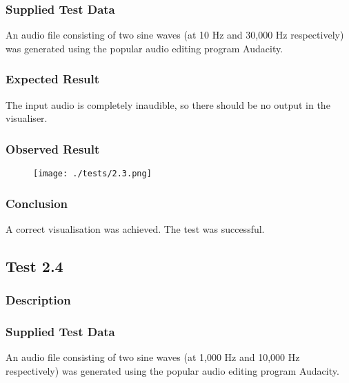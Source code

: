 \subsubsection*{Supplied Test Data}
An audio file consisting of two sine waves (at 10 Hz and 30,000 Hz respectively) was generated using the popular audio editing program Audacity.

\subsubsection*{Expected Result}
The input audio is completely inaudible, so there should be no output in the visualiser.

\subsubsection*{Observed Result}
\label{sec:evidence2.3}
\begin{figure}[H]
	\texttt{[image: ./tests/2.3.png]}
\end{figure}

\subsubsection*{Conclusion}
A correct visualisation was achieved. The test was successful.

\pagebreak
\subsection{Test 2.4}
\subsubsection*{Description}
\paragraph{}
{
	\centering
}

\subsubsection*{Supplied Test Data}
An audio file consisting of two sine waves (at 1,000 Hz and 10,000 Hz respectively) was generated using the popular audio editing program Audacity.

